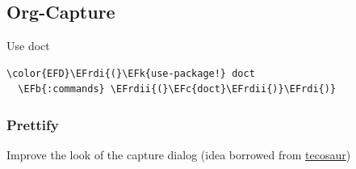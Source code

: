 \documentclass{scrartcl}
\newcommand{\EFk}[1]{\textcolor{EFk}{#1}} %
\newcommand{\EFb}[1]{\textcolor{EFb}{#1}} %
\newcommand{\EFc}[1]{\textcolor{EFc}{#1}} %
\newcommand{\EFrdi}[1]{#1} %
\newcommand{\EFrdii}[1]{#1} %
\begin{document}
\subsection{Org-Capture}
\label{sec:org95b708a}
Use doct
\begin{Code}
\begin{Verbatim}[]
\color{EFD}\EFrdi{(}\EFk{use-package!} doct
  \EFb{:commands} \EFrdii{(}\EFc{doct}\EFrdii{)}\EFrdi{)}
\end{Verbatim}
\end{Code}

\subsubsection{Prettify}
\label{sec:org6549498}
Improve the look of the capture dialog (idea borrowed from \href{https://github.com/tecosaur}{tecosaur})
\end{document}
